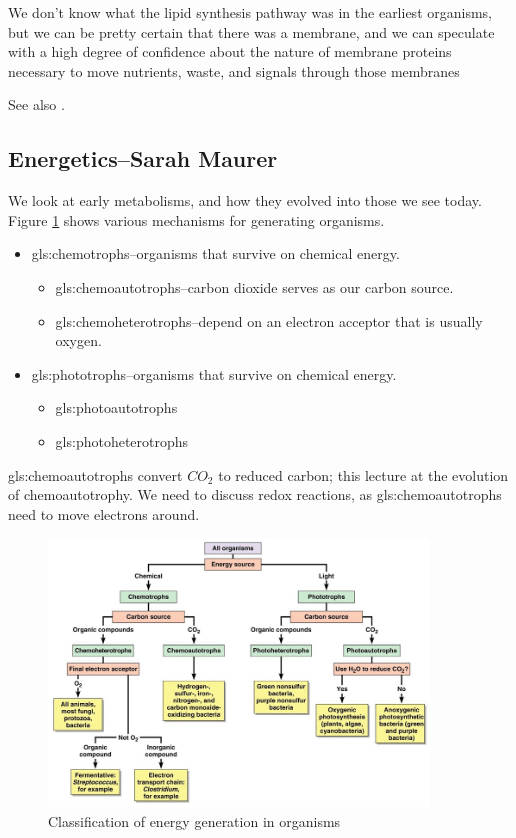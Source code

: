 \documentclass[]{article}
\begin{document}
We don't know what the lipid synthesis pathway was in the earliest organisms, but we can be pretty certain that there was a membrane, and we can speculate with a high degree of confidence about the nature of membrane proteins necessary to move nutrients, waste, and signals through those membranes

See also \cite{weiss2016physiology,bar2011survey,fuchs2011alternative}.

\subsection[Energetics]{Energetics--Sarah Maurer}

We look at early metabolisms, and how they evolved into those we see today. 
Figure \ref{fig:ClassificationEnergyGeneration} shows various mechanisms for generating organisms.
\begin{itemize}
	\item \Glspl{gls:chemotroph}--organisms that survive on chemical energy.
	\begin{itemize}
		\item \Glspl{gls:chemoautotroph}--carbon dioxide serves as our carbon source.
		\item \Glspl{gls:chemoheterotroph}--depend on an electron acceptor that is usually oxygen.
	\end{itemize}
	\item \Glspl{gls:phototroph}--organisms that survive on chemical energy.
	\begin{itemize}
		\item \Glspl{gls:photoautotroph}
		\item \Glspl{gls:photoheterotroph}
	\end{itemize}
\end{itemize}

 \Glspl{gls:chemoautotroph} convert $CO_2$ to reduced carbon; this lecture at the evolution of chemoautotrophy. We need to discuss redox reactions, as \glspl{gls:chemoautotroph} need to move electrons around.

\begin{figure}[H]
	\caption{Classification of energy generation in organisms} \label{fig:ClassificationEnergyGeneration} 
	\includegraphics[width=0.9\textwidth]{ClassificationEnergyGeneration}
\end{figure}
\end{document}
